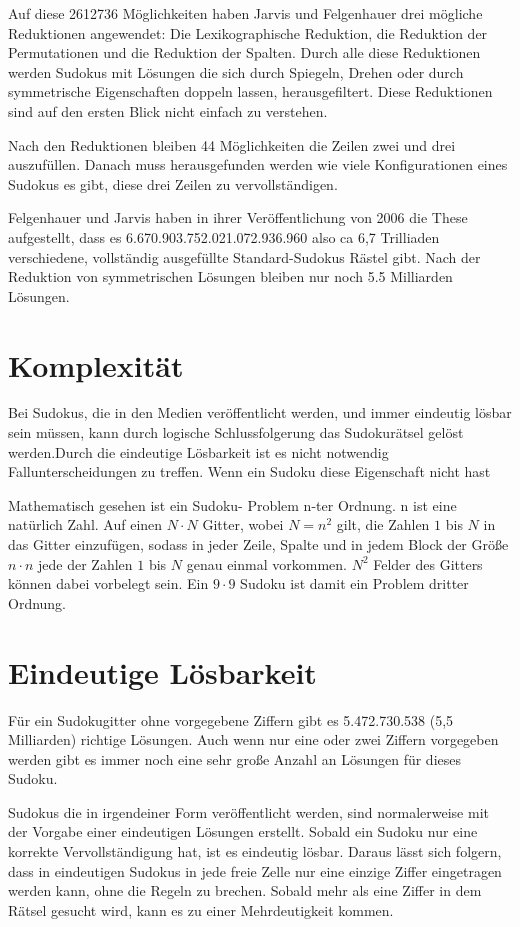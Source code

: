 Auf diese 2612736 Möglichkeiten haben Jarvis und Felgenhauer drei mögliche Reduktionen angewendet: Die Lexikographische Reduktion, die Reduktion der Permutationen und die Reduktion der Spalten. Durch alle diese Reduktionen werden Sudokus mit Lösungen die sich durch Spiegeln, Drehen oder durch symmetrische Eigenschaften doppeln lassen, herausgefiltert. Diese Reduktionen sind auf den ersten Blick nicht einfach zu verstehen.

Nach den Reduktionen bleiben 44 Möglichkeiten die Zeilen zwei und drei auszufüllen. Danach muss herausgefunden werden wie viele Konfigurationen eines Sudokus es gibt, diese drei Zeilen zu vervollständigen. 

Felgenhauer und Jarvis haben in ihrer Veröffentlichung von 2006 die These aufgestellt, dass es 6.670.903.752.021.072.936.960 also ca 6,7 Trilliaden verschiedene, vollständig ausgefüllte Standard-Sudokus Rästel gibt. Nach der Reduktion von symmetrischen Lösungen bleiben nur noch 5.5 Milliarden Lösungen. \cite{FelgenhauerJarvis}

\section{Komplexität}
Bei Sudokus, die in den Medien veröffentlicht werden, und immer eindeutig lösbar sein müssen, kann durch logische Schlussfolgerung das Sudokurätsel gelöst werden.Durch die eindeutige Lösbarkeit ist es nicht notwendig Fallunterscheidungen zu treffen. Wenn ein Sudoku diese Eigenschaft nicht hast 

Mathematisch gesehen ist ein Sudoku- Problem n-ter Ordnung. n ist eine natürlich Zahl. Auf einen $N\cdot N$ Gitter, wobei $N=n^2$ gilt, die Zahlen $1$ bis $N$ in das Gitter einzufügen, sodass in jeder Zeile, Spalte und in jedem Block der Größe $n\cdot n$ jede der Zahlen $1$ bis $N$ genau einmal vorkommen. $N^2$ Felder des Gitters können dabei vorbelegt sein. Ein $9\cdot9$ Sudoku ist damit ein Problem dritter Ordnung.

\section{Eindeutige Lösbarkeit}
Für ein Sudokugitter ohne vorgegebene Ziffern gibt es 5.472.730.538 (5,5 Milliarden) richtige Lösungen. Auch wenn nur eine oder zwei Ziffern vorgegeben werden gibt es immer noch eine sehr große Anzahl an Lösungen für dieses Sudoku. 

Sudokus die in irgendeiner Form veröffentlicht werden, sind normalerweise mit der Vorgabe einer eindeutigen Lösungen erstellt. Sobald ein Sudoku nur eine korrekte Vervollständigung hat, ist es eindeutig lösbar. Daraus lässt sich folgern, dass in eindeutigen Sudokus in jede freie Zelle nur eine einzige Ziffer eingetragen werden kann, ohne die Regeln zu brechen. Sobald mehr als eine Ziffer in dem Rätsel gesucht wird, kann es zu einer Mehrdeutigkeit kommen. 

